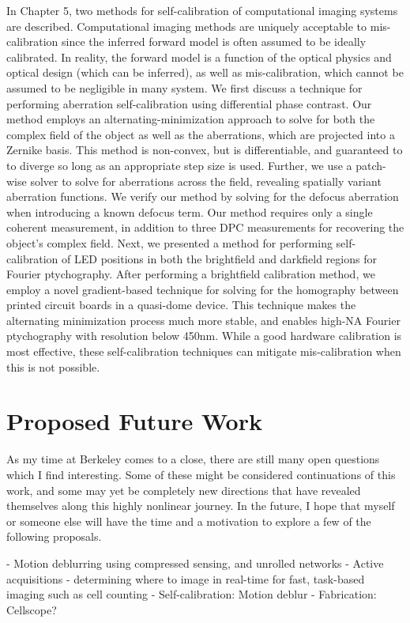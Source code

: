 In Chapter 5, two methods for self-calibration of computational imaging systems are described. Computational imaging methods are uniquely acceptable to mis-calibration since the inferred forward model is often assumed to be ideally calibrated. In reality, the forward model is a function of the optical physics and optical design (which can be inferred), as well as mis-calibration, which cannot be assumed to be negligible in many system. We first discuss a technique for performing aberration self-calibration using differential phase contrast. Our method employs an alternating-minimization approach to solve for both the complex field of the object as well as the aberrations, which are projected into a Zernike basis. This method is non-convex, but is differentiable, and guaranteed to to diverge so long as an appropriate step size is used. Further, we use a patch-wise solver to solve for aberrations across the field, revealing spatially variant aberration functions. We verify our method by solving for the defocus aberration when introducing a known defocus term. Our method requires only a single coherent measurement, in addition to three DPC measurements for recovering the object's complex field. Next, we presented a method for performing self-calibration of LED positions in both the brightfield and darkfield regions for Fourier ptychography. After performing a brightfield calibration method, we employ a novel gradient-based technique for solving for the homography between printed circuit boards in a quasi-dome device. This technique makes the alternating minimization process much more stable, and enables high-NA Fourier ptychography with resolution below 450nm. While a good hardware calibration is most effective, these self-calibration techniques can mitigate mis-calibration when this is not possible.

\section{Proposed Future Work}
As my time at Berkeley comes to a close, there are still many open questions which I find interesting. Some of these might be considered continuations of this work, and some may yet be completely new directions that have revealed themselves along this highly nonlinear journey. In the future, I hope that myself or someone else will have the time and a motivation to explore a few of the following proposals.

- Motion deblurring using compressed sensing, and unrolled networks
- Active acquisitions - determining where to image in real-time for fast, task-based imaging such as cell counting
- Self-calibration: Motion deblur
- Fabrication: Cellscope?

